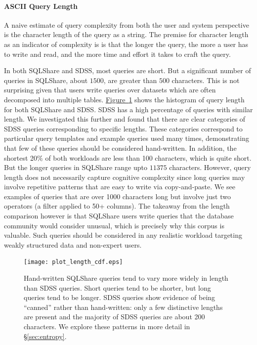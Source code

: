 \documentclass{sig-alternate}
\newcommand{\figref}[1]{\hyperref[#1]{Figure~\ref*{#1}}}
\newcommand{\secref}[1]{\hyperref[#1]{\S\ref*{#1}}}
\newcommand{\sqlshare}{SQLShare}
\begin{document}
\paragraph*{ASCII Query Length}

A naive estimate of query complexity from both the user and system perspective is the character length of the query as a string.  The premise for character length as an indicator of complexity is is that the longer the query, the more a user has to write and read, and the more time and effort it takes to craft the query.

In both \sqlshare{} and SDSS, most queries are short.  But a significant number of queries in \sqlshare{}, about $1500$, are greater than $500$ characters. This is not surprising given that users write queries over datasets which are often decomposed into multiple tables.  \figref{fig:qlengthcdf} shows the histogram of query length for both \sqlshare{} and SDSS. 
SDSS has a high percentage of queries with similar length. We investigated this further and found that there are clear categories of SDSS queries corresponding to specific lengths. These categories correspond to particular query templates and example queries used many times, demonstrating that few of these queries should be considered hand-written.
In addition, the shortest 20\% of both workloads are less than 100 characters, which is quite short.  But the longer queries in \sqlshare{} range upto $11375$ characters. 
However, query length does not necessarily capture cognitive complexity since long queries may involve repetitive patterns that are easy to write via copy-and-paste.  
We see examples of queries that are over 1000 characters long but involve just two operators (a filter applied to 50+ columns).
The takeaway from the length comparison however is that \sqlshare{} users write queries that the database community would consider unusual, which is precisely why this corpus is valuable.  Such queries should be considered in any realistic workload targeting weakly structured data and non-expert users.

\begin{figure}
\centering
\texttt{[image: plot\_length\_cdf.eps]}
\caption{Hand-written \sqlshare{} queries tend to vary more widely in length than SDSS queries.  Short queries tend to be shorter, but long queries tend to be longer.  SDSS queries show evidence of being ``canned'' rather than hand-written: only a few distinctive lengths are present and the majority of SDSS queries are about 200 characters.  We explore these patterns in more detail in \secref{sec:entropy}.}
\label{fig:qlengthcdf}
\end{figure}
\end{document}
